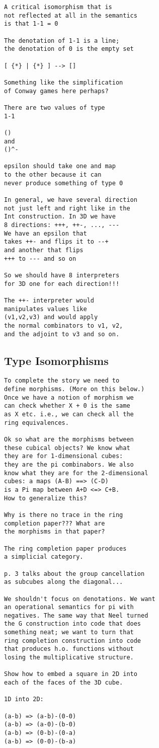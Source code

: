 \documentclass[authoryear,preprint]{sigplanconf}
\begin{document}
\begin{verbatim}
A critical isomorphism that is 
not reflected at all in the semantics
is that 1-1 = 0 

The denotation of 1-1 is a line;
the denotation of 0 is the empty set

[ {*} | {*} ] --> []

Something like the simplification
of Conway games here perhaps?

There are two values of type
1-1

() 
and 
()^-

epsilon should take one and map
to the other because it can
never produce something of type 0

In general, we have several direction
not just left and right like in the
Int construction. In 3D we have
8 directions: +++, ++-, ..., ---
We have an epsilon that 
takes ++- and flips it to --+
and another that flips
+++ to --- and so on

So we should have 8 interpreters
for 3D one for each direction!!!

The ++- interpreter would 
manipulates values like
(v1,v2,v3) and would apply
the normal combinators to v1, v2, 
and the adjoint to v3 and so on.
\end{verbatim}

\subsection{Type Isomorphisms}

\begin{verbatim}
To complete the story we need to 
define morphisms. (More on this below.)
Once we have a notion of morphism we 
can check whether X + 0 is the same
as X etc. i.e., we can check all the 
ring equivalences. 

Ok so what are the morphisms between 
these cubical objects? We know what
they are for 1-dimensional cubes: 
they are the pi combinabors. We also
know what they are for the 2-dimensional 
cubes: a maps (A-B) ==> (C-D) 
is a Pi map between A+D <=> C+B. 
How to generalize this? 

Why is there no trace in the ring 
completion paper??? What are 
the morphisms in that paper?

The ring completion paper produces
a simplicial category.

p. 3 talks about the group cancellation
as subcubes along the diagonal... 

We shouldn't focus on denotations. We want
an operational semantics for pi with 
negatives. The same way that Neel turned
the G construction into code that does
something neat; we want to turn that 
ring completion construction into code
that produces h.o. functions without
losing the multiplicative structure.

Show how to embed a square in 2D into
each of the faces of the 3D cube.

1D into 2D:

(a-b) => (a-b)-(0-0)
(a-b) => (a-0)-(b-0)
(a-b) => (0-b)-(0-a)
(a-b) => (0-0)-(b-a)

\end{verbatim}
\end{document}
